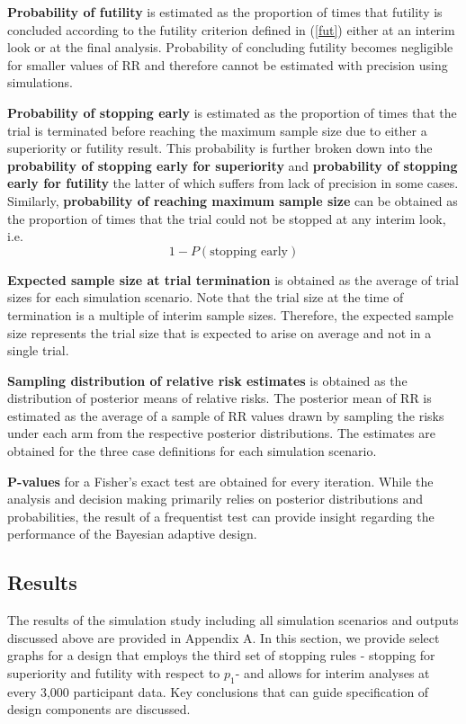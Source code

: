 \documentclass[12pt]{article}
\begin{document}
{\bf Probability of futility} is estimated as the proportion of times that futility is concluded according to the futility criterion defined in (\ref{fut}) either at an interim look or at the final analysis. Probability of concluding futility becomes negligible for smaller values of RR and therefore cannot be estimated with precision using simulations.

{\bf Probability of stopping early} is estimated as the proportion of times that the trial is terminated before reaching the maximum sample size due to either a superiority or futility result. This probability is further broken down into the {\bf probability of stopping early for superiority} and {\bf probability of stopping early for futility} the latter of which suffers from lack of precision in some cases. Similarly, {\bf probability of reaching maximum sample size} can be obtained as the proportion of times that the trial could not be stopped at any interim look, i.e. 
$$1-P(\text{stopping early})$$

{\bf Expected sample size at trial termination} is obtained as the average of trial sizes for each simulation scenario. Note that the trial size at the time of termination is a multiple of interim sample sizes. Therefore, the expected sample size represents the trial size that is expected to arise on average and not in a single trial. 

{\bf Sampling distribution of relative risk estimates} is obtained as the distribution of posterior means of relative risks. The posterior mean of RR  is estimated as the average of a sample of RR values drawn by sampling the risks under each arm from the respective posterior distributions. The estimates are obtained for the three case definitions for each simulation scenario.

{\bf P-values} for a Fisher's exact test are obtained for every iteration. While the analysis and decision making primarily relies on posterior distributions and probabilities, the result of a frequentist test can provide insight regarding the performance of the Bayesian adaptive design.


\subsection{Results}

The results of the simulation study including all simulation scenarios and outputs discussed above are provided in Appendix A. In this section, we provide select graphs for a design that employs the third set of stopping rules - stopping for superiority and futility with respect to $p_1$- and allows for interim analyses at every 3,000 participant data.  Key conclusions that can guide specification of design components are discussed. 
\end{document}
